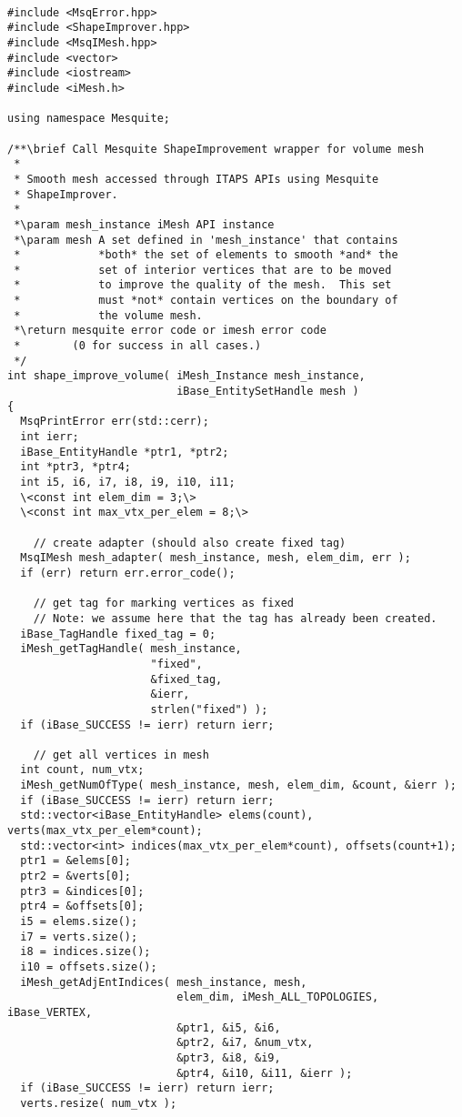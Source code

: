 \begin{lstlisting}

#include <MsqError.hpp>
#include <ShapeImprover.hpp>
#include <MsqIMesh.hpp>
#include <vector>
#include <iostream>
#include <iMesh.h>

using namespace Mesquite;

/**\brief Call Mesquite ShapeImprovement wrapper for volume mesh
 *
 * Smooth mesh accessed through ITAPS APIs using Mesquite
 * ShapeImprover.
 *
 *\param mesh_instance iMesh API instance
 *\param mesh A set defined in 'mesh_instance' that contains
 *            *both* the set of elements to smooth *and* the
 *            set of interior vertices that are to be moved
 *            to improve the quality of the mesh.  This set
 *            must *not* contain vertices on the boundary of
 *            the volume mesh.
 *\return mesquite error code or imesh error code
 *        (0 for success in all cases.)
 */
int shape_improve_volume( iMesh_Instance mesh_instance,
                          iBase_EntitySetHandle mesh )
{
  MsqPrintError err(std::cerr);
  int ierr;
  iBase_EntityHandle *ptr1, *ptr2;
  int *ptr3, *ptr4;
  int i5, i6, i7, i8, i9, i10, i11;
  \<const int elem_dim = 3;\>
  \<const int max_vtx_per_elem = 8;\>
  
    // create adapter (should also create fixed tag)
  MsqIMesh mesh_adapter( mesh_instance, mesh, elem_dim, err );
  if (err) return err.error_code();

    // get tag for marking vertices as fixed
    // Note: we assume here that the tag has already been created.
  iBase_TagHandle fixed_tag = 0;
  iMesh_getTagHandle( mesh_instance,
                      "fixed",
                      &fixed_tag,
                      &ierr,
                      strlen("fixed") );
  if (iBase_SUCCESS != ierr) return ierr;

    // get all vertices in mesh
  int count, num_vtx;
  iMesh_getNumOfType( mesh_instance, mesh, elem_dim, &count, &ierr );
  if (iBase_SUCCESS != ierr) return ierr;
  std::vector<iBase_EntityHandle> elems(count), verts(max_vtx_per_elem*count);
  std::vector<int> indices(max_vtx_per_elem*count), offsets(count+1);
  ptr1 = &elems[0];
  ptr2 = &verts[0];
  ptr3 = &indices[0];
  ptr4 = &offsets[0];
  i5 = elems.size();
  i7 = verts.size();
  i8 = indices.size();
  i10 = offsets.size();
  iMesh_getAdjEntIndices( mesh_instance, mesh, 
                          elem_dim, iMesh_ALL_TOPOLOGIES, iBase_VERTEX,
                          &ptr1, &i5, &i6,
                          &ptr2, &i7, &num_vtx,
                          &ptr3, &i8, &i9,
                          &ptr4, &i10, &i11, &ierr );
  if (iBase_SUCCESS != ierr) return ierr;
  verts.resize( num_vtx );


\end{lstlisting}
